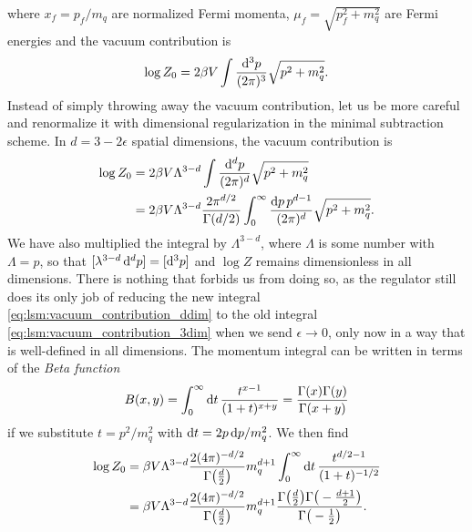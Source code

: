 where $x_f = p_f / m_q$ are normalized Fermi momenta, $\mu_f = \sqrt{p_f^2 + m_q^2}$ are Fermi energies and the vacuum contribution is
\begin{equation}
	\log Z_0 = 2 \beta V \int \frac{\mathop{}\!\mathrm{d}^3 p}{(2 \pi)^3} \sqrt{p^2 + m_q^2 } .
\label{eq:lsm:vacuum_contribution_3dim}
\end{equation}
Instead of simply throwing away the vacuum contribution, let us be more careful and renormalize it with dimensional regularization in the minimal subtraction scheme.
In $d = 3 - 2 \epsilon$ spatial dimensions, the vacuum contribution is
\begin{equation}
\begin{split}
	\log Z_0 &= 2 \beta V \Lambda^{3-d} \int \frac{\mathop{}\!\mathrm{d}^d p}{(2 \pi)^d} \sqrt{p^2 + m_q^2} \\
	         &= 2 \beta V \Lambda^{3-d} \frac{2 \pi^{d/2}}{\Gamma(d/2)} \int_0^\infty \frac{\mathop{}\!\mathrm{d} p \, p^{d-1}}{(2 \pi)^d} \sqrt{p^2 + m_q^2} .
\end{split}
\label{eq:lsm:vacuum_contribution_ddim}
\end{equation}
We have also multiplied the integral by $\Lambda^{3-d}$,
where $\Lambda$ is some number with $\unit{\Lambda} = \unit{p}$,
so that $[\lambda^{3-d} \mathop{}\!\mathrm{d}^d p] = [\mathop{}\!\mathrm{d}^3 p]$ and $\log Z$ remains dimensionless in all dimensions.
There is nothing that forbids us from doing so, 
as the regulator still does its only job of reducing the new integral \eqref{eq:lsm:vacuum_contribution_ddim} to the old integral \eqref{eq:lsm:vacuum_contribution_3dim} when we send $\epsilon \rightarrow 0$,
only now in a way that is well-defined in all dimensions.
The momentum integral can be written in terms of the \emph{Beta function} 
\begin{equation}
	B(x,y) = \int_0^\infty \mathop{}\!\mathrm{d} t \, \frac{t^{x-1}}{(1+t)^{x+y}} = \frac{\Gamma(x) \Gamma(y)}{\Gamma(x+y)}
\end{equation}
if we substitute $t = p^2/m_q^2$ with $\mathop{}\!\mathrm{d} t = 2 p \mathop{}\!\mathrm{d} p / m_q^2$.
We then find
\begin{equation}
\begin{split}
	\log Z_0 &= \beta V \Lambda^{3-d} \frac{2 (4 \pi)^{-d/2}}{\Gamma\big(\frac{d}{2}\big)} m_q^{d+1} \int_0^\infty \mathop{}\!\mathrm{d} t \, \frac{t^{d/2-1}}{(1+t)^{-1/2}} \\
	         &= \beta V \Lambda^{3-d} \frac{2 (4 \pi)^{-d/2}}{\Gamma\big(\frac{d}{2}\big)} m_q^{d+1} \frac{\Gamma\big(\frac{d}{2}\big) \Gamma\big( -\frac{d+1}{2} \big)}{\Gamma\big( -\frac{1}{2} \big)} .
\end{split}
\end{equation}
